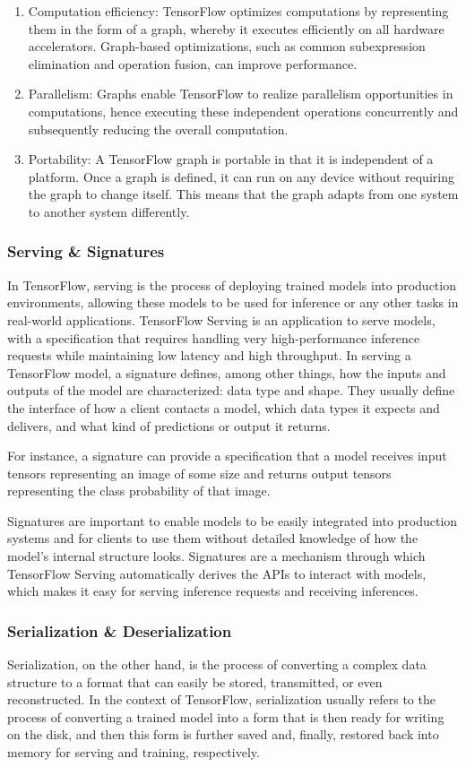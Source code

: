 \documentclass[a4paper]{report}
\begin{document}
{\begin{enumerate}[label=\arabic*.]
    \item Computation efficiency: TensorFlow optimizes computations by representing them in the form of a graph, whereby it executes efficiently on all hardware accelerators. Graph-based optimizations, such as common subexpression elimination and operation fusion, can improve performance.
    \item Parallelism: Graphs enable TensorFlow to realize parallelism opportunities in computations, hence executing these independent operations concurrently and subsequently reducing the overall computation.
    \item Portability: A TensorFlow graph is portable in that it is independent of a platform. Once a graph is defined, it can run on any device without requiring the graph to change itself. This means that the graph adapts from one system to another system differently.
\end{enumerate}
\subsubsection{Serving \& Signatures}
In TensorFlow, serving is the process of deploying trained models into production environments, allowing these models to be used for inference or any other tasks in real-world applications. TensorFlow Serving is an application to serve models, with a specification that requires handling very high-performance inference requests while maintaining low latency and high throughput.
In serving a TensorFlow model, a signature defines, among other things, how the inputs and outputs of the model are characterized: data type and shape. They usually define the interface of how a client contacts a model, which data types it expects and delivers, and what kind of predictions or output it returns.

For instance, a signature can provide a specification that a model receives input tensors representing an image of some size and returns output tensors representing the class probability of that image.

Signatures are important to enable models to be easily integrated into production systems and for clients to use them without detailed knowledge of how the model's internal structure looks. Signatures are a mechanism through which TensorFlow Serving automatically derives the APIs to interact with models, which makes it easy for serving inference requests and receiving inferences.
\subsubsection{Serialization \& Deserialization}
Serialization, on the other hand, is the process of converting a complex data structure to a format that can easily be stored, transmitted, or even reconstructed. In the context of TensorFlow, serialization usually refers to the process of converting a trained model into a form that is then ready for writing on the disk, and then this form is further saved and, finally, restored back into memory for serving and training, respectively.

}
\end{document}
